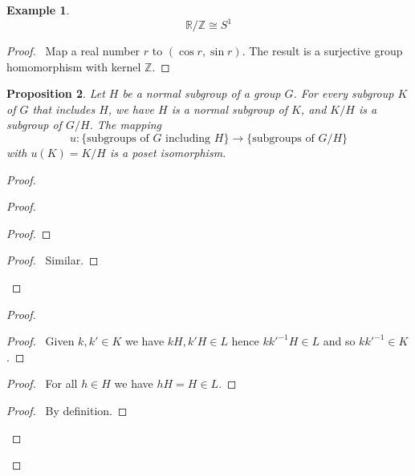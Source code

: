 \documentclass{book}
\let\qed\relax
\newtheorem{prop}{Proposition}[chapter]
\theoremstyle{definition}
\newtheorem{ex}[prop]{Example}
\newcommand{\inv}[1]{\ensuremath{{#1}^{-1}}}
\begin{document}
\begin{ex}
\[ \mathbb{R} / \mathbb{Z} \cong S^1 \]
\end{ex}

\begin{proof}
\pf\ Map a real number $r$ to $(\cos r, \sin r)$. The result is a surjective group homomorphism with kernel $\mathbb{Z}$. \qed
\end{proof}

\begin{prop}
Let $H$ be a normal subgroup of a group $G$. For every subgroup $K$ of $G$ that includes $H$, we have $H$ is a normal subgroup of $K$, and $K/H$ is a subgroup of $G/H$. The mapping
\[ u : \{ \text{subgroups of } G \text{ including } H \} \rightarrow \{ \text{subgroups of } G / H \} \]
with $u(K) = K/H$ is a poset isomorphism.
\end{prop}

\begin{proof}
\pf
{}
\begin{proof}
	\begin{proof}
		\step{iv}{$k\inv{k'} \in H$}
		\step{v}{$k \inv{k'} \in K_2$}
	\end{proof}
	\begin{proof}
		\pf\ Similar.
	\end{proof}
\end{proof}
\begin{proof}
	\begin{proof}
		\pf\ Given $k,k' \in K$ we have $kH,k'H \in L$ hence $k\inv{k'}H \in L$ and so $k\inv{k'} \in K$.
	\end{proof}
	\begin{proof}
		\pf\ For all $h \in H$ we have $hH = H \in L$.
	\end{proof}
	\begin{proof}
		\pf\ By definition.
	\end{proof}
\end{proof}
\qed
\end{proof}
\end{document}
